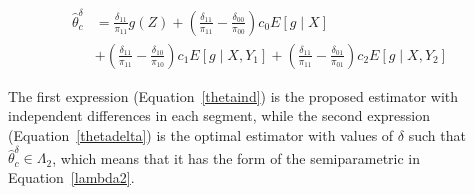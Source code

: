 \documentclass[12pt]{article}
\begin{document}
\begin{align}\label{thetadelta}
  \hat \theta^{\delta}_c 
  &= \frac{\delta_{11}}{\pi_{11}} g(Z) 
  + \left(\frac{\delta_{11}}{\pi_{11}} - \frac{\delta_{00}}{\pi_{00}}\right) 
   c_0 E[g \mid X] \\ \nonumber
  &+
  \left(\frac{\delta_{11}}{\pi_{11}} - 
  \frac{\delta_{10}}{\pi_{10}}\right) c_1 E[g \mid X, Y_1] +
  \left(\frac{\delta_{11}}{\pi_{11}} - 
  \frac{\delta_{01}}{\pi_{01}}\right) c_2 E[g \mid X, Y_2]
\end{align}

The first expression (Equation~\ref{thetaind}) is the proposed estimator 
with independent differences in each segment, while the second expression 
(Equation~\ref{thetadelta}) is the optimal estimator with values of $\delta$
such that $\hat \theta^{\delta}_c \in \Lambda_2$, which means that it has 
the form of the semiparametric in Equation~\ref{lambda2}.

\newpage 

\printbibliography
\end{document}
